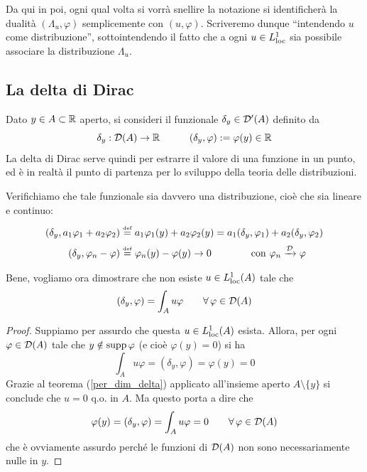 \begin{rem}
Da qui in poi, ogni qual volta si vorrà snellire la notazione si identificherà la dualità $(\Lambda_u,\varphi)$ semplicemente con $(u,\varphi)$. Scriveremo dunque ``intendendo $u$ come distribuzione'', sottointendendo il fatto che a ogni $u\in L^1_{\operatorname{loc}}$ sia possibile associare la distribuzione $\Lambda_u$.
\end{rem}

\subsection{La delta di Dirac}

Dato $y\in A\subset\mathbb{R}$ aperto, si consideri il funzionale $\delta_y\in\mathcal{D}'(A)$ definito da
\begin{equation*}
\delta_y:\mathcal{D}(A)\to\mathbb{R}\quad\qquad (\delta_y,\varphi):=\varphi(y)\in\mathbb{R}
\end{equation*}
La delta di Dirac serve quindi per estrarre il valore di una funzione in un punto, ed è in realtà il punto di partenza per lo sviluppo della teoria delle distribuzioni.

Verifichiamo che tale funzionale sia davvero una distribuzione, cioè che sia lineare e continuo:
\begin{align*}
(\delta_y,a_1\varphi_1+a_2\varphi_2)&\overset{\underset{\mathrm{def}}{}}{=}a_1\varphi_1(y)+a_2\varphi_2(y)=a_1(\delta_y,\varphi_1)+a_2(\delta_y,\varphi_2) \\
(\delta_y,\varphi_n-\varphi)&\overset{\underset{\mathrm{def}}{}}{=}\varphi_n(y)-\varphi(y)\to0\qquad \qquad \text{con }\varphi_n\xrightarrow[]{\mathcal{D}}\varphi
\end{align*}

Bene, vogliamo ora dimostrare che non esiste $u\in L^1_{\operatorname{loc}}(A)$ tale che
\begin{equation*}
(\delta_y,\varphi)=\int_A u\varphi\qquad \forall\varphi\in\Dc(A)
\end{equation*}

\begin{proof}
Suppiamo per assurdo che questa $u\in L^1_{\operatorname{loc}}(A)$ esista. Allora, per ogni $\varphi\in\mathcal{D}(A)$ tale che $y\notin\operatorname*{supp}\varphi$ (e cioè $\varphi(y)=0$) si ha
\begin{equation*}
\int_A u\varphi=(\delta_y,\varphi)=\varphi(y)=0
\end{equation*}
Grazie al teorema (\ref{per_dim_delta}) applicato all'insieme aperto $A\setminus\{y\}$ si conclude che $u=0$ q.o. in $A$. Ma questo porta a dire che
\begin{equation*}
\varphi(y)=(\delta_y,\varphi)=\int_Au\varphi=0\qquad \forall \varphi\in\Dc(A)
\end{equation*}
che è ovviamente assurdo perché le funzioni di $\mathcal{D}(A)$ non sono necessariamente nulle in $y$.
\end{proof}

